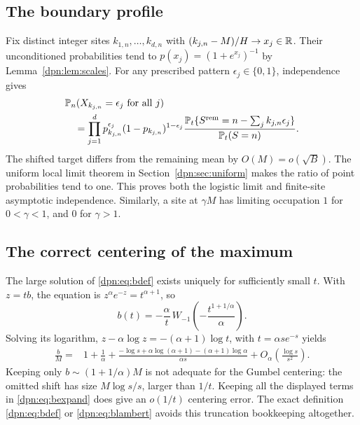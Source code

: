 \documentclass[11pt]{article}
\numberwithin{equation}{section}
\theoremstyle{definition}\newtheorem{definition}[theorem]{Definition}
\theoremstyle{remark}\newtheorem{remark}[theorem]{Remark}
\begin{document}
\subsection{The boundary profile}
Fix distinct integer sites $k_{1,n},\ldots,k_{d,n}$ with
$(k_{j,n}-M)/H\to x_j\in\mathbb R$. Their unconditioned probabilities tend to
$p(x_j)=(1+e^{x_j})^{-1}$ by Lemma~\ref{dpn:lem:scales}.
For any prescribed pattern $\epsilon_j\in\{0,1\}$, independence gives
\begin{align}\label{dpn:eq:pattern}
 &\mathbb P_n(X_{k_{j,n}}=\epsilon_j\text{ for all }j)\notag\\
 &\quad=\prod_{j=1}^d p_{k_{j,n}}^{\epsilon_j}
                       (1-p_{k_{j,n}})^{1-\epsilon_j}
 \frac{\mathbb P_t\{S^{\rm rem}=n-\sum_jk_{j,n}\epsilon_j\}}
      {\mathbb P_t(S=n)}.
\end{align}
The shifted target differs from the remaining mean by $O(M)=o(\sqrt B)$.
The uniform local limit theorem in Section~\ref{dpn:sec:uniform} makes the ratio
of point probabilities tend to one. This proves both the logistic limit and
finite-site asymptotic independence. Similarly, a site at $\gamma M$ has
limiting occupation $1$ for $0<\gamma<1$, and $0$ for $\gamma>1$.

\subsection{The correct centering of the maximum}
The large solution of \eqref{dpn:eq:bdef} exists uniquely for sufficiently small
$t$. With $z=tb$, the equation is $z^\alpha e^{-z}=t^{\alpha+1}$, so
\begin{equation}\label{dpn:eq:blambert}
 b(t)=-\frac\alpha t\,
 W_{-1}\left(-\frac{t^{1+1/\alpha}}\alpha\right).
\end{equation}
Solving its logarithm,
$z-\alpha\log z=-(\alpha+1)\log t$, with $t=\alpha s e^{-s}$ yields
\begin{align}\label{dpn:eq:bexpand}
 \frac bM={}&1+\frac1\alpha
 +\frac{-\log s+\alpha\log(\alpha+1)-(\alpha+1)\log\alpha}
                {\alpha s}
 +O_\alpha\left(\frac{\log s}{s^2}\right).
\end{align}
Keeping only $b\sim(1+1/\alpha)M$ is not adequate for the Gumbel
centering: the omitted shift has size $M\log s/s$, larger than $1/t$.
Keeping all the displayed terms in \eqref{dpn:eq:bexpand} does give an
$o(1/t)$ centering error. The exact definition \eqref{dpn:eq:bdef} or
\eqref{dpn:eq:blambert} avoids this truncation bookkeeping altogether.
\end{document}
